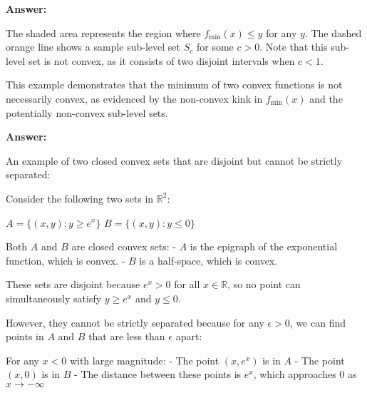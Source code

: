 \documentclass{article}
\newenvironment{answer}
    {\par\noindent\textbf{Answer:}\par}
    {\par}
\begin{document}
\begin{enumerate}
\begin{enumerate}
\begin{answer}
\begin{center}
        \end{center}
        
        The shaded area represents the region where $f_{\min}(x) \leq y$ for any $y$. The dashed orange line shows a sample sub-level set $S_c$ for some $c > 0$. Note that this sub-level set is not convex, as it consists of two disjoint intervals when $c < 1$.
        
        This example demonstrates that the minimum of two convex functions is not necessarily convex, as evidenced by the non-convex kink in $f_{\min}(x)$ and the potentially non-convex sub-level sets.
        \end{answer}
        
        
        \begin{answer}
        An example of two closed convex sets that are disjoint but cannot be strictly separated:

        Consider the following two sets in $\mathbb{R}^2$:

        $A = \{(x, y) : y \geq e^x\}$
        $B = \{(x, y) : y \leq 0\}$

        Both $A$ and $B$ are closed convex sets:
        - $A$ is the epigraph of the exponential function, which is convex.
        - $B$ is a half-space, which is convex.

        These sets are disjoint because $e^x > 0$ for all $x \in \mathbb{R}$, so no point can simultaneously satisfy $y \geq e^x$ and $y \leq 0$.

        However, they cannot be strictly separated because for any $\epsilon > 0$, we can find points in $A$ and $B$ that are less than $\epsilon$ apart:

        For any $x < 0$ with large magnitude:
        - The point $(x, e^x)$ is in $A$
        - The point $(x, 0)$ is in $B$
        - The distance between these points is $e^x$, which approaches 0 as $x \to -\infty$

        \begin{center}
\end{center}
\end{answer}
\end{enumerate}
\end{enumerate}
\end{document}
